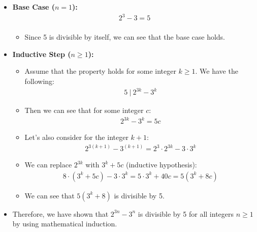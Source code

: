\documentclass[12pt]{article}
\begin{document}
\begin{itemize}
    \item \textbf{Base Case ($n = 1$):}
    \begin{equation*}
        \begin{split}
         2^3 - 3 = 5\\
        \end{split}
    \end{equation*}
    \begin{itemize}
        \item Since 5 is divisible by itself, we can see that the base case holds.
    \end{itemize}
    \item \textbf{Inductive Step ($n \geq 1$):}
    \begin{itemize}
        \item Assume that the property holds for some integer $k \geq 1$. We have the following:
        \begin{equation*}
            \begin{split}
            5 \ | \ 2^{3k} - 3^k
            \end{split}
        \end{equation*}
        \item Then we can see that for some integer $c$:
        \begin{equation*}
            \begin{split}
            2^{3k} - 3^k = 5c
            \end{split}
        \end{equation*}
        \item Let's also consider for the integer $k + 1$:
        \begin{equation*}
            \begin{split}
            2^{3(k+1)} - 3^{(k+1)} = 2^3\cdot2^{3k} - 3\cdot3^k 
            \end{split}
        \end{equation*}
        \item We can replace $2^{3k}$ with $3^k + 5c$ (inductive hypothesis):
        \begin{equation*}
            \begin{split}
            8 \cdot (3^k + 5c) - 3 \cdot 3^k = 5 \cdot 3^k + 40c = 5(3^k + 8c)
            \end{split}
        \end{equation*}
        \item We can see that $5(3^k + 8)$ is divisible by 5.
    \end{itemize}
    \item Therefore, we have shown that $2^{3n} - 3^n$ is divisible by 5 for all integers $n \geq 1$ by using mathematical induction.
\end{itemize}
\end{document}
